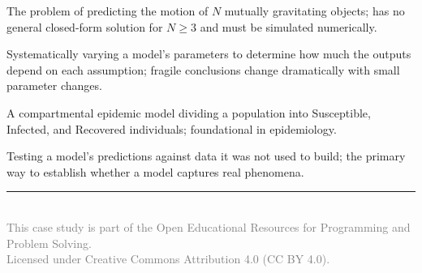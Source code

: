 \documentclass[11pt,letterpaper]{article}
\newcommand{\cscourse}{Programming and Problem Solving}
\begin{document}
\begin{glossarybox}
\begin{description}[leftmargin=!, labelwidth=3.8cm, font=\bfseries\color{cssecondary}]
    \item[$N$-Body Problem] The problem of predicting the motion of $N$ mutually gravitating objects; has no general closed-form solution for $N \geq 3$ and must be simulated numerically.

    \item[Sensitivity Analysis] Systematically varying a model's parameters to determine how much the outputs depend on each assumption; fragile conclusions change dramatically with small parameter changes.

    \item[SIR Model] A compartmental epidemic model dividing a population into Susceptible, Infected, and Recovered individuals; foundational in epidemiology.

    \item[Validation] Testing a model's predictions against data it was not used to build; the primary way to establish whether a model captures real phenomena.
\end{description}
\end{glossarybox}

\vspace{5mm}

\begin{center}
\textcolor{csprimary}{\rule{0.6\textwidth}{0.5pt}}\\[3mm]
{\small\textcolor{gray}{This case study is part of the Open Educational Resources for \cscourse.\\
Licensed under Creative Commons Attribution 4.0 (CC BY 4.0).}}
\end{center}
\end{document}
